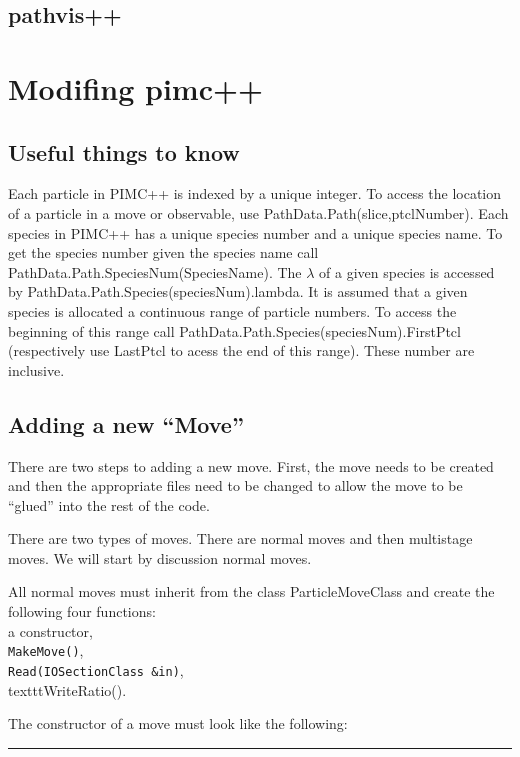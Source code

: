 \documentclass{book}
\begin{document}
\section{pathvis++}


\chapter{Modifing pimc++}
\section{Useful things to know}
Each particle in PIMC++ is indexed by a unique integer.  To access the
location of a particle in a move or observable, use
PathData.Path(slice,ptclNumber). Each species in PIMC++ has a unique
species number and a unique species name.  To get the species number
given the species name call PathData.Path.SpeciesNum(SpeciesName).
The $\lambda$ of a given species is accessed by
PathData.Path.Species(speciesNum).lambda.   It is assumed
that a given species is allocated a continuous range of particle
numbers.  To access the beginning of this range call
PathData.Path.Species(speciesNum).FirstPtcl (respectively use LastPtcl
to acess the end of this range).  These number are inclusive.
\section{Adding a new ``Move''}
There are two steps to adding a new move. First, the move needs to be
created and then the appropriate files need to be changed to allow the
move to be ``glued'' into the rest of the code.

There are two types of moves. There are normal moves and then
multistage moves. We will start by discussion normal moves.


All normal moves must inherit from the class ParticleMoveClass and 
create the following four functions: \\
a constructor,\\
\texttt{MakeMove()},\\
\texttt{Read(IOSectionClass \&in)},  \\
texttt{WriteRatio()}.


The constructor of a move must look like the following:\\

\rule{0.6cm}{0cm}
\end{document}

